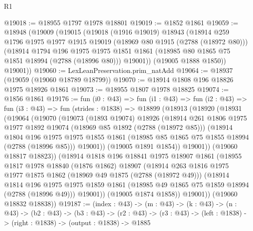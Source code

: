 \begin{lexlean}{R1}
\begin{coremodule}
@19018 := @18955 @1797 @1978 @18801
@19019 := @1852 @1861
@19059 := @18948
    (@19009
      (@19015
        (@19018
          (@1916 @19019)
          @18943
          (@18914
            @259
            @1796
            @1975
            @1977
            @1915
            @19019
            (@18969 @80 @1915 (@2788 (@18972 @80)))
            (@18914
              @1794
              @196
              @1975
              @1975
              @1851
              @1861
              (@18985 @80 @1865 @75 @1851 @18994 (@2788 (@18996 @80)))
              @19001))
          (@19005 @1888 @1850))
        @19001))
@19060 := LexLeanPreservation.prim_natAdd
@19064 := @18937 (@19059 (@19060 @18789 @18799))
@19070 := @18914 @1808 @196 @18826 @1975 @18926 @1861
@19073 := @18955 @1807 @1978 @18825
@19074 := @1856 @1861
@19176 := fun (i0 : @43) =>
  fun (i1 : @43) =>
  fun (i2 : @43) =>
  fun (i3 : @43) =>
  fun (strides : @1838) =>
  @18899
    (@18913
      (@18920
        (@18931
          (@19064
            (@19070
              (@19073
                (@1893 @19074)
                @18926
                (@18914
                  @261
                  @1806
                  @1975
                  @1977
                  @1892
                  @19074
                  (@18969 @85 @1892 (@2788 (@18972 @85)))
                  (@18914
                    @1804
                    @196
                    @1975
                    @1975
                    @1855
                    @1861
                    (@18985 @85 @1865 @75 @1855 @18994 (@2788 (@18996 @85)))
                    @19001))
                (@19005 @1891 @1854))
              @19001))
          (@19060 @18817 @18823))
        (@18914
          @1818
          @196
          @18841
          @1975
          @18907
          @1861
          (@18955
            @1817
            @1978
            @18840
            (@1876 @1862)
            @18907
            (@18914
              @263
              @1816
              @1975
              @1977
              @1875
              @1862
              (@18969 @49 @1875 (@2788 (@18972 @49)))
              (@18914
                @1814
                @196
                @1975
                @1975
                @1859
                @1861
                (@18985 @49 @1865 @75 @1859 @18994 (@2788 (@18996 @49)))
                @19001))
            (@19005 @1874 @1858))
          @19001))
      (@19060 @18832 @18838))
@19187 := (index : @43) ->
  (m : @43) ->
  (k : @43) ->
  (n : @43) ->
  (b2 : @43) ->
  (b3 : @43) ->
  (r2 : @43) -> (r3 : @43) -> (left : @1838) -> (right : @1838) -> (output : @1838) -> @1885

\end{coremodule}
\end{lexlean}
